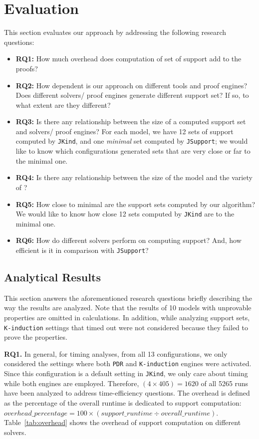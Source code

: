 \section{Evaluation}
\label{sec:eval}
This section evaluates our approach by addressing the following research questions:

\begin{itemize}
    \item \textbf{RQ1:} How much overhead does computation of set of support add to the proofs? 
    \item \textbf{RQ2:} How dependent is our approach on different tools and proof engines? Does different solvers/ proof engines generate different support set? If so, to what extent are they different?
    \item \textbf{RQ3:} Is there any relationship between the size of a computed support set and 
    solvers/ proof engines? For each model, we have 12 sets of support computed by \texttt{JKind}, and one \emph{minimal} set computed by \texttt{JSupport}; we would like to know which configurations generated sets that are very close or far to the minimal one.
    \item \textbf{RQ4:} Is there any relationship between the size of the model and the variety of ?
    \item \textbf{RQ5:} How close to minimal are the support sets computed by our algorithm? We would like to know how close 12 sets computed by \texttt{JKind} are to the minimal one.
    \item \textbf{RQ6:} How do different solvers perform on computing support? And, how efficient is it in comparison with \texttt{JSupport}?
\end{itemize} 

\subsection{Analytical Results}
\label{sec:res}
This section answers the aforementioned research questions briefly describing the way the results are analyzed. Note that the results of 10 models with unprovable properties are omitted in calculations. In addition, while analyzing support sets, \texttt{K-induction} settings that timed out were not considered because they failed to prove the properties.

\textbf{RQ1.} In general, for timing analyses, from all 13 configurations, we only considered the settings where both \texttt{PDR} and \texttt{K-induction} engines were activated. Since this configuration is a default setting in \texttt{JKind}, we only care about timing while both engines are employed. Therefore, $(4 \times 405) = 1620$ of all 5265 runs have been analyzed to address time-efficiency questions. The overhead is defined as the percentage of the overall runtime is dedicated to support computation:
\mbox{$overhead\_percentage = 100 \times (support\_runtime \div overall\_runtime)$}.
 Table~\ref{tab:overhead} shows the overhead of support computation on different solvers.

